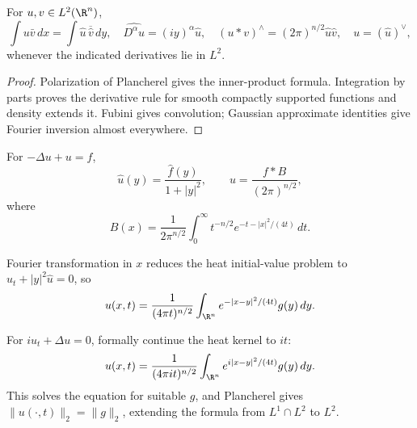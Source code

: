 \begin{theorem}
\label{thm:fourier-transform-properties}
For $u,v\in L^2(\R^n)$,
\[
\int u\bar v\,dx=\int\hat u\,\overline{\hat v}\,dy,
\quad \widehat{D^\alpha u}=(iy)^\alpha\hat u,
\quad (u*v)^\wedge=(2\pi)^{n/2}\hat u\hat v,
\quad u=(\hat u)^\vee,
\]
whenever the indicated derivatives lie in $L^2$.
\end{theorem}

\begin{proof}
\sketch Polarization of Plancherel gives the inner-product formula.
Integration by parts proves the derivative rule for smooth compactly supported
functions and density extends it. Fubini gives convolution; Gaussian
approximate identities give Fourier inversion almost everywhere.
\end{proof}

\begin{example}
\label{ex:bessel-potentials}
For $-\Delta u+u=f$,
\[
\hat u(y)=\frac{\hat f(y)}{1+|y|^2},\qquad
u=\frac{f*B}{(2\pi)^{n/2}},
\]
where
\[
B(x)=\frac1{2\pi^{n/2}}\int_0^\infty t^{-n/2}e^{-t-|x|^2/(4t)}\,dt.
\]
\end{example}

\begin{example}
\label{ex:fourier-transform-heat-fundamental-solution}
Fourier transformation in $x$ reduces the heat initial-value problem to
$\hat u_t+|y|^2\hat u=0$, so
\[
u(x,t)=\frac1{(4\pi t)^{n/2}}\int_{\R^n}e^{-|x-y|^2/(4t)}g(y)\,dy.
\]
\end{example}

\begin{example}
\label{ex:schrodinger-fundamental-solution}
For $iu_t+\Delta u=0$, formally continue the heat kernel to $it$:
\[
u(x,t)=\frac1{(4\pi it)^{n/2}}\int_{\R^n}e^{i|x-y|^2/(4t)}g(y)\,dy.
\]
This solves the equation for suitable $g$, and Plancherel gives
$\|u(\cdot,t)\|_2=\|g\|_2$, extending the formula from $L^1\cap L^2$ to
$L^2$.
\end{example}

